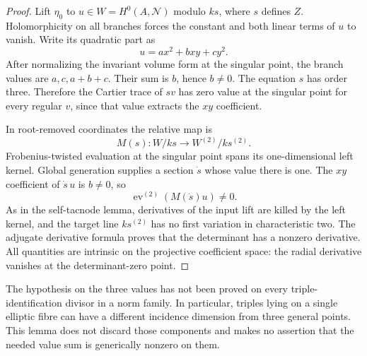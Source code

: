 \begin{proof}
Lift $\eta_0$ to $u\in W=H^0(A,\mathcal N)$ modulo $ks$, where
$s$ defines $Z$. Holomorphicity on all branches forces the
constant and both linear terms of $u$ to vanish. Write its
quadratic part as
\[
                          u=a x^2+bxy+c y^2.
\]
After normalizing the invariant volume form at the singular point,
the branch values are $a,c,a+b+c$. Their sum is $b$, hence $b\ne0$.
The equation $s$ has order three. Therefore the Cartier trace of
$sv$ has zero value at the singular point for every regular $v$,
since that value extracts the $xy$ coefficient.

In root-removed coordinates the relative map is
\[
                  M(s):W/ks\longrightarrow W^{(2)}/ks^{(2)}.
\]
Frobenius-twisted evaluation at the singular point spans its
one-dimensional left kernel. Global generation supplies a
section $\dot s$ whose value there is one. The $xy$ coefficient
of $\dot s\,u$ is $b\ne0$, so
\[
                \operatorname{ev}^{(2)}(M(\dot s)u)\ne0.
\]
As in the self-tacnode lemma, derivatives of the input lift are
killed by the left kernel, and the target line $ks^{(2)}$ has no
first variation in characteristic two. The adjugate derivative
formula proves that the determinant has a nonzero derivative.
All quantities are intrinsic on the projective coefficient space:
the radial derivative vanishes at the determinant-zero point.
\end{proof}

\begin{remark}
The hypothesis on the three values has not been proved on every
triple-identification divisor in a norm family. In particular,
triples lying on a single elliptic fibre can have a different
incidence dimension from three general points. This lemma does
not discard those components and makes no assertion that the
needed value sum is generically nonzero on them.
\end{remark}

